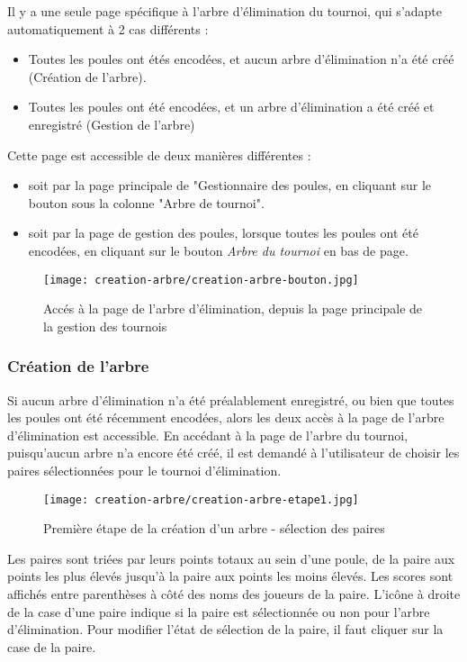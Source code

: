 Il y a une seule page spécifique à l'arbre d'élimination du tournoi, qui s'adapte automatiquement à 2 cas différents :

\begin{itemize}
\item Toutes les poules ont étés encodées, et aucun arbre d'élimination n'a été créé (Création de l'arbre).
\item Toutes les poules ont été encodées, et un arbre d'élimination a été créé et enregistré (Gestion de l'arbre)
\end{itemize}
\bigskip

Cette page est accessible de deux manières différentes :

\begin{itemize}
\item soit par la page principale de "Gestionnaire des poules, en cliquant sur le bouton sous la colonne "Arbre de tournoi".
\item soit par la page de gestion des poules, lorsque toutes les poules ont été encodées, en cliquant sur le bouton \textit{Arbre du tournoi} en bas de page.
\end{itemize}
\bigskip

\begin{figure}[H]
\centering
\texttt{[image: creation-arbre/creation-arbre-bouton.jpg]}
\caption{Accés à la page de l'arbre d'élimination, depuis la page principale de la gestion des tournois}
\end{figure}

\subsubsection{Création de l'arbre}

Si aucun arbre d'élimination n'a été préalablement enregistré, ou bien que toutes les poules ont été récemment encodées, alors les deux accès à la page de l'arbre d'élimination est accessible. En accédant à la page de l'arbre du tournoi, puisqu'aucun arbre n'a encore été créé, il est demandé à l'utilisateur de choisir les paires sélectionnées pour le tournoi d'élimination.

\begin{figure}[H]
\centering
\texttt{[image: creation-arbre/creation-arbre-etape1.jpg]}
\caption{Première étape de la création d'un arbre - sélection des paires}
\end{figure}

Les paires sont triées par leurs points totaux au sein d'une poule, de la paire aux points les plus élevés jusqu'à la paire aux points les moins élevés. Les scores sont affichés entre parenthèses à côté des noms des joueurs de la paire. L'icône à droite de la case d'une paire indique si la paire est sélectionnée ou non pour l'arbre d'élimination. Pour modifier l'état de sélection de la paire, il faut cliquer sur la case de la paire.\newline

